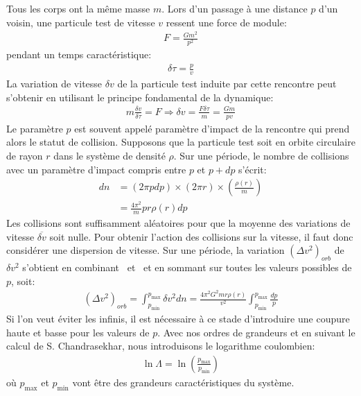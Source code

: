 Tous les corps ont la même masse $m$. Lors d'un passage à une distance $p$ d'un voisin, une particule test de vitesse $v$ ressent une force de module:
\begin{align*}
	F=\frac{Gm^{2}}{p^{2}}%
\end{align*}
pendant un temps caractéristique:
\begin{align*}
	\delta\tau=\frac{p}{v}
\end{align*}
La variation de vitesse $\delta v$ de la particule test induite par cette rencontre peut s'obtenir en utilisant le principe fondamental de la dynamique:
\begin{align}
	m\frac{\delta v}{\delta\tau}=F\Rightarrow\delta v=\frac{F\delta\tau}{m}=\frac{Gm}{pv} \label{deltavrel}
\end{align}
Le paramètre $p$ est souvent appelé paramètre d'impact de la rencontre qui prend alors le statut de collision. Supposons que la particule test soit
en orbite circulaire de rayon $r$ dans le système de densité $\rho$. Sur une période, le nombre de collisions avec
un paramètre d'impact compris entre $p$ et $p+dp$ s'écrit:
\begin{align}
	dn  &= \left(  2\pi pdp\right)  \times\left(  2\pi r\right)  \times\left(\frac{\rho\left(  r\right)  }{m}\right) \label{dnrel}\\
	    &= \frac{4\pi^{2}}{m}pr\rho\left(  r\right)  dp
\end{align}
Les collisions sont suffisamment aléatoires pour que la moyenne des variations de vitesse $\overline{\delta v}$ soit nulle. Pour obtenir l'action des
collisions sur la vitesse, il faut donc considérer une dispersion de vitesse. Sur une période, la variation $\left(\Delta v^{2}\right)_{orb}$ de
$\delta v^{2}$ s'obtient en combinant~ et~ et en sommant sur toutes les valeurs possibles de $p$, soit:
\begin{align*}
	\left(\Delta v^{2}\right)_{orb}=\int_{p_{\min}}^{p_{\max}}\delta v^{2}dn=\frac{4\pi^{2}G^{2}mr\rho\left(r\right)}{v^{2}}\int_{p_{\min}}^{p_{\max}}\frac{dp}{p}
\end{align*}
Si l'on veut éviter les infinis, il est nécessaire à ce stade d'introduire une coupure haute et basse pour les valeurs de $p$. Avec nos ordres de
grandeurs et en suivant le calcul de S. Chandrasekhar, nous introduisons le logarithme coulombien:
\begin{align*}
	\ln\Lambda=\ln\left(\frac{p_{\max}}{p_{\min}}\right)
\end{align*}
où $p_\mathrm{max}$ et $p_\mathrm{min}$ vont être des grandeurs caractéristiques du système.
